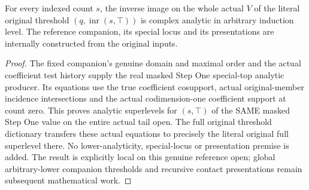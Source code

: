 \begin{theorem}
\label{hir:original-frozen-companion-special-tail-analytic-producer}
\leanok
{}
For every indexed count $s$, the inverse image on the whole actual $V$ of
the literal original threshold $(q,\operatorname{inr}(s,\top))$ is complex
analytic in arbitrary induction level. The reference companion, its
special locus and its presentations are internally constructed from the
original inputs.
\end{theorem}
\begin{proof}
The fixed companion's genuine domain and maximal order and the actual
coefficient test history supply the real masked Step One special-top
analytic producer. Its equations use the true coefficient cosupport,
actual original-member incidence intersections and the actual
codimension-one coefficient support at count zero. This proves analytic
superlevels for $(s,\top)$ of the SAME masked Step One value on the entire
actual tail open. The full original threshold dictionary transfers these
actual equations to precisely the literal original full superlevel there.
No lower-analyticity, special-locus or presentation premise is added.
The result is explicitly local on this genuine reference open; global
arbitrary-lower companion thresholds and recursive contact presentations
remain subsequent mathematical work.
\end{proof}
